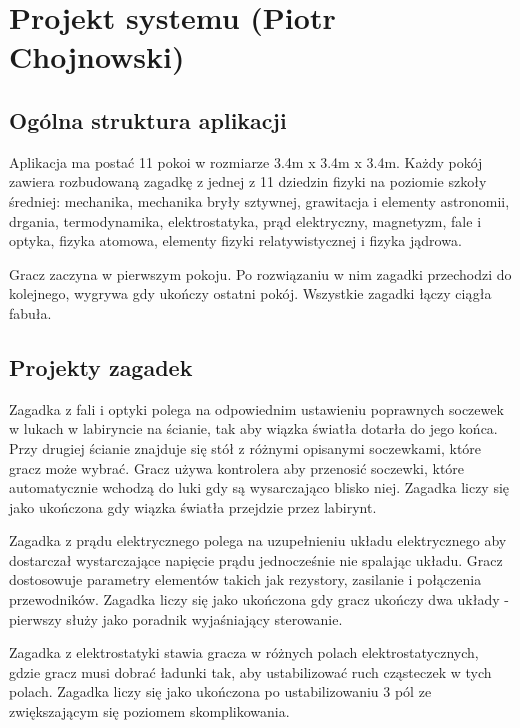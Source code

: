 \chapter{Projekt systemu (Piotr Chojnowski)}
\label{chap:project}

\section{Ogólna struktura aplikacji}
Aplikacja ma postać 11 pokoi w rozmiarze 3.4m x 3.4m x 3.4m. Każdy pokój zawiera rozbudowaną zagadkę z jednej z 11 dziedzin fizyki na poziomie szkoły średniej: mechanika, mechanika bryły sztywnej, grawitacja i elementy astronomii, drgania, termodynamika, elektrostatyka, prąd elektryczny, magnetyzm, fale i optyka, fizyka atomowa, elementy fizyki relatywistycznej i fizyka jądrowa.

Gracz zaczyna w pierwszym pokoju. Po rozwiązaniu w nim zagadki przechodzi do kolejnego, wygrywa gdy ukończy ostatni pokój. Wszystkie zagadki łączy ciągła fabuła.

\section{Projekty zagadek}
Zagadka z fali i optyki polega na odpowiednim ustawieniu poprawnych soczewek w lukach w labiryncie na ścianie, tak aby wiązka światła dotarła do jego końca. Przy drugiej ścianie znajduje się stół z różnymi opisanymi soczewkami, które gracz może wybrać. Gracz używa kontrolera aby przenosić soczewki, które automatycznie wchodzą do luki gdy są wysarczająco blisko niej. Zagadka liczy się jako ukończona gdy wiązka światła przejdzie przez labirynt.

Zagadka z prądu elektrycznego polega na uzupełnieniu układu elektrycznego aby dostarczał wystarczające napięcie prądu jednocześnie nie spalając układu. Gracz dostosowuje parametry elementów takich jak rezystory, zasilanie i połączenia przewodników. Zagadka liczy się jako ukończona gdy gracz ukończy dwa układy - pierwszy służy jako poradnik wyjaśniający sterowanie.

Zagadka z elektrostatyki stawia gracza w różnych polach elektrostatycznych, gdzie gracz musi dobrać ładunki tak, aby ustabilizować ruch cząsteczek w tych polach. Zagadka liczy się jako ukończona po ustabilizowaniu 3 pól ze zwiększającym się poziomem skomplikowania.
